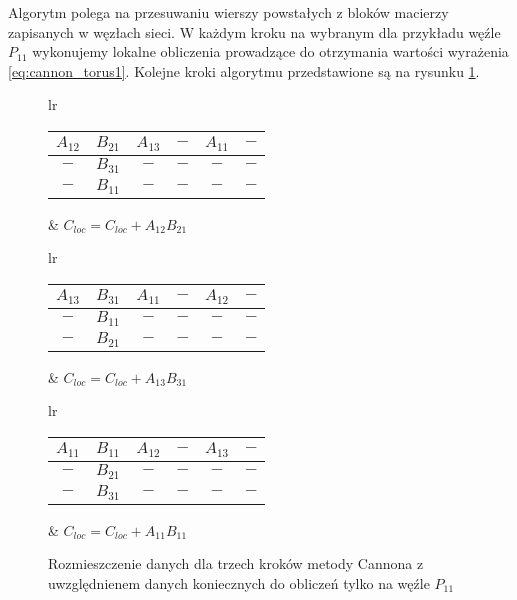 \noindent Algorytm polega na przesuwaniu wierszy powstałych z bloków macierzy zapisanych w węzłach sieci. W każdym kroku na wybranym dla przykładu węźle \(P_{11}\) wykonujemy lokalne obliczenia prowadzące do otrzymania wartości wyrażenia \eqref{eq:cannon_torus1}. Kolejne kroki algorytmu przedstawione są na rysunku \ref{fig:cannon_torus3}.


\begin{figure}[h]
\centering
\begin{tabular}{lr}
\begin{tabular}{|cc|cc|cc|}
\hline
\(A_{12}\) & \(B_{21}\) & \(A_{13}\) & \(-\) & \(A_{11}\) & \(-\) \\
\hline
\(-\) & \(B_{31}\) & \(-\) & \(-\) & \(-\) & \(-\) \\
\hline
\(-\) & \(B_{11}\) & \(-\) & \(-\) & \(-\) & \(-\) \\
\hline
\end{tabular} &
\hspace{1cm}\(C_{loc}=C_{loc}+A_{12}B_{21}\)
\end{tabular}

\vspace{0.5cm}

\begin{tabular}{lr}
\begin{tabular}{|cc|cc|cc|}
\hline
\(A_{13}\) & \(B_{31}\) & \(A_{11}\) & \(-\) & \(A_{12}\) & \(-\) \\
\hline
\(-\) & \(B_{11}\) & \(-\) & \(-\) & \(-\) & \(-\) \\
\hline
\(-\) & \(B_{21}\) & \(-\) & \(-\) & \(-\) & \(-\) \\
\hline
\end{tabular} &
\hspace{1cm}\(C_{loc}=C_{loc}+A_{13}B_{31}\)
\end{tabular}

\vspace{0.5cm}

\begin{tabular}{lr}
\begin{tabular}{|cc|cc|cc|}
\hline
\(A_{11}\) & \(B_{11}\) & \(A_{12}\) & \(-\) & \(A_{13}\) & \(-\) \\
\hline
\(-\) & \(B_{21}\) & \(-\) & \(-\) & \(-\) & \(-\) \\
\hline
\(-\) & \(B_{31}\) & \(-\) & \(-\) & \(-\) & \(-\) \\
\hline
\end{tabular} &
\hspace{1cm}\(C_{loc}=C_{loc}+A_{11}B_{11}\)
\end{tabular}
\caption{Rozmieszczenie danych dla trzech kroków metody Cannona z uwzględnienem danych koniecznych do obliczeń tylko na węźle \(P_{11}\)}
\label{fig:cannon_torus3}
\end{figure}

